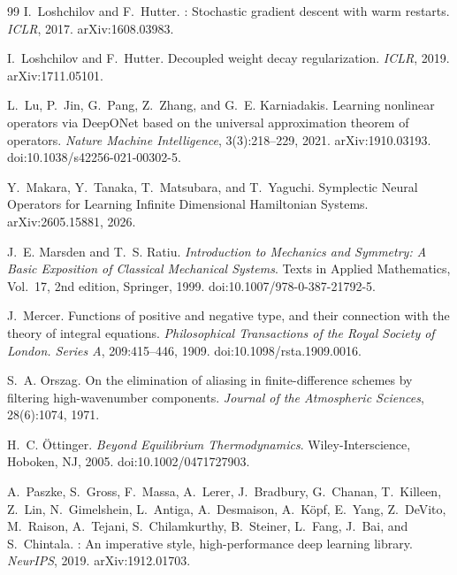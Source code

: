 \documentclass[11pt]{article}
\theoremstyle{definition}
\theoremstyle{remark}
\begin{document}
\begin{thebibliography}{99}
I.~Loshchilov and F.~Hutter.
: Stochastic gradient descent with warm restarts.
\newblock \emph{ICLR}, 2017. arXiv:1608.03983.

I.~Loshchilov and F.~Hutter.
\newblock Decoupled weight decay regularization.
\newblock \emph{ICLR}, 2019. arXiv:1711.05101.

L.~Lu, P.~Jin, G.~Pang, Z.~Zhang, and G.~E. Karniadakis.
\newblock Learning nonlinear operators via DeepONet based on the universal
approximation theorem of operators.
\newblock \emph{Nature Machine Intelligence}, 3(3):218--229, 2021.
arXiv:1910.03193. doi:10.1038/s42256-021-00302-5.

Y.~Makara, Y.~Tanaka, T.~Matsubara, and T.~Yaguchi.
\newblock Symplectic Neural Operators for Learning Infinite Dimensional
Hamiltonian Systems.
\newblock arXiv:2605.15881, 2026.

J.~E. Marsden and T.~S. Ratiu.
\newblock \emph{Introduction to Mechanics and Symmetry: A Basic Exposition of
Classical Mechanical Systems}.
\newblock Texts in Applied Mathematics, Vol.~17, 2nd edition, Springer, 1999.
doi:10.1007/978-0-387-21792-5.

J.~Mercer.
\newblock Functions of positive and negative type, and their connection with the
theory of integral equations.
\newblock \emph{Philosophical Transactions of the Royal Society of London.
Series A}, 209:415--446, 1909. doi:10.1098/rsta.1909.0016.

S.~A. Orszag.
\newblock On the elimination of aliasing in finite-difference schemes by
filtering high-wavenumber components.
\newblock \emph{Journal of the Atmospheric Sciences}, 28(6):1074, 1971.

H.~C. \"Ottinger.
\newblock \emph{Beyond Equilibrium Thermodynamics}.
\newblock Wiley-Interscience, Hoboken, NJ, 2005. doi:10.1002/0471727903.

A.~Paszke, S.~Gross, F.~Massa, A.~Lerer, J.~Bradbury, G.~Chanan, T.~Killeen,
Z.~Lin, N.~Gimelshein, L.~Antiga, A.~Desmaison, A.~K\"opf, E.~Yang,
Z.~DeVito, M.~Raison, A.~Tejani, S.~Chilamkurthy, B.~Steiner, L.~Fang, J.~Bai,
and S.~Chintala.
: An imperative style, high-performance deep learning
library.
\newblock \emph{NeurIPS}, 2019. arXiv:1912.01703.


\end{thebibliography}
\end{document}

